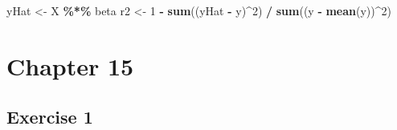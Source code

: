 \documentclass[
]{book}
\newenvironment{Shaded}{\begin{snugshade}}{\end{snugshade}}
\newcommand{\DecValTok}[1]{\textcolor[rgb]{0.00,0.00,0.81}{#1}}
\newcommand{\KeywordTok}[1]{\textcolor[rgb]{0.13,0.29,0.53}{\textbf{#1}}}
\newcommand{\NormalTok}[1]{#1}
\newcommand{\OperatorTok}[1]{\textcolor[rgb]{0.81,0.36,0.00}{\textbf{#1}}}
\newcommand{\StringTok}[1]{\textcolor[rgb]{0.31,0.60,0.02}{#1}}
\begin{document}
\begin{Shaded}
\begin{Highlighting}[]
\NormalTok{yHat \textless{}{-}}\StringTok{ }\NormalTok{X }\OperatorTok{\%*\%}\StringTok{ }\NormalTok{beta}
\NormalTok{r2 \textless{}{-}}\StringTok{ }\DecValTok{1} \OperatorTok{{-}}\StringTok{ }\KeywordTok{sum}\NormalTok{((yHat }\OperatorTok{{-}}\StringTok{ }\NormalTok{y)}\OperatorTok{\^{}}\DecValTok{2}\NormalTok{) }\OperatorTok{/}\StringTok{ }\KeywordTok{sum}\NormalTok{((y }\OperatorTok{{-}}\StringTok{ }\KeywordTok{mean}\NormalTok{(y))}\OperatorTok{\^{}}\DecValTok{2}\NormalTok{)}
\end{Highlighting}
\end{Shaded}

\hypertarget{chapter-15-1}{%
\section*{Chapter 15}\label{chapter-15-1}}

\hypertarget{exercise-1-9}{%
\subsection*{Exercise 1}\label{exercise-1-9}}
\end{document}
